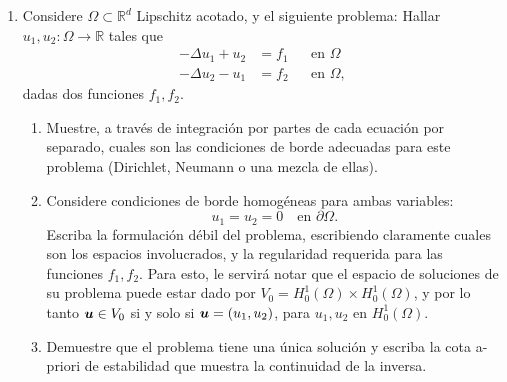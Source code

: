 \documentclass{article}
\renewcommand{\vec}{\vectorsym}
\newcommand{\R}{\mathbb{R}}
\newcommand{\pts}[1]{[{\bf #1 puntos}] }
\begin{document}
\begin{enumerate}
        \item Considere $\Omega\subset \R^d$ Lipschitz acotado, y el siguiente problema: Hallar $u_1, u_2:\Omega \to \R$  tales que
            $$ 
            \begin{aligned}
                -\Delta u_1 + u_2 &= f_1  && \text{en $\Omega$} \\
                -\Delta u_2 - u_1 &= f_2  && \text{en $\Omega$},
            \end{aligned}
            $$
            dadas dos funciones $f_1,f_2$. 
            \begin{enumerate}
                \item\pts{2} Muestre, a través de integración por partes de cada ecuación por separado, cuales son las condiciones de borde adecuadas para este problema (Dirichlet, Neumann o una mezcla de ellas). 
                \item\pts{2} Considere condiciones de borde homogéneas para ambas variables: 
                        $$ u_1 = u_2 = 0 \quad\text{en $\partial\Omega$}. $$
                       Escriba la formulación débil del problema, escribiendo claramente cuales son los espacios involucrados, y la regularidad requerida para las funciones $f_1, f_2$. Para esto, le servirá notar que el espacio de soluciones de su problema puede estar dado por $V_0 = H_0^1(\Omega)\times H_0^1(\Omega)$, y por lo tanto $\vec u \in V_0$ si y solo si $\vec u = (u_1, u_2)$, para $u_1, u_2$ en $H_0^1(\Omega)$. 
                   \item\pts{2} Demuestre que el problema tiene una única solución y escriba la cota a-priori de estabilidad que muestra la continuidad de la inversa. 
            \end{enumerate}


\end{enumerate}
\end{document}
